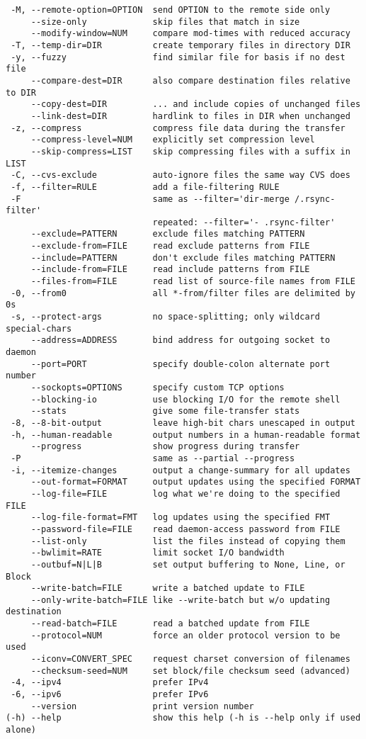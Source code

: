 \begin{lstlisting}
 -M, --remote-option=OPTION  send OPTION to the remote side only
     --size-only             skip files that match in size
     --modify-window=NUM     compare mod-times with reduced accuracy
 -T, --temp-dir=DIR          create temporary files in directory DIR
 -y, --fuzzy                 find similar file for basis if no dest file
     --compare-dest=DIR      also compare destination files relative to DIR
     --copy-dest=DIR         ... and include copies of unchanged files
     --link-dest=DIR         hardlink to files in DIR when unchanged
 -z, --compress              compress file data during the transfer
     --compress-level=NUM    explicitly set compression level
     --skip-compress=LIST    skip compressing files with a suffix in LIST
 -C, --cvs-exclude           auto-ignore files the same way CVS does
 -f, --filter=RULE           add a file-filtering RULE
 -F                          same as --filter='dir-merge /.rsync-filter'
                             repeated: --filter='- .rsync-filter'
     --exclude=PATTERN       exclude files matching PATTERN
     --exclude-from=FILE     read exclude patterns from FILE
     --include=PATTERN       don't exclude files matching PATTERN
     --include-from=FILE     read include patterns from FILE
     --files-from=FILE       read list of source-file names from FILE
 -0, --from0                 all *-from/filter files are delimited by 0s
 -s, --protect-args          no space-splitting; only wildcard special-chars
     --address=ADDRESS       bind address for outgoing socket to daemon
     --port=PORT             specify double-colon alternate port number
     --sockopts=OPTIONS      specify custom TCP options
     --blocking-io           use blocking I/O for the remote shell
     --stats                 give some file-transfer stats
 -8, --8-bit-output          leave high-bit chars unescaped in output
 -h, --human-readable        output numbers in a human-readable format
     --progress              show progress during transfer
 -P                          same as --partial --progress
 -i, --itemize-changes       output a change-summary for all updates
     --out-format=FORMAT     output updates using the specified FORMAT
     --log-file=FILE         log what we're doing to the specified FILE
     --log-file-format=FMT   log updates using the specified FMT
     --password-file=FILE    read daemon-access password from FILE
     --list-only             list the files instead of copying them
     --bwlimit=RATE          limit socket I/O bandwidth
     --outbuf=N|L|B          set output buffering to None, Line, or Block
     --write-batch=FILE      write a batched update to FILE
     --only-write-batch=FILE like --write-batch but w/o updating destination
     --read-batch=FILE       read a batched update from FILE
     --protocol=NUM          force an older protocol version to be used
     --iconv=CONVERT_SPEC    request charset conversion of filenames
     --checksum-seed=NUM     set block/file checksum seed (advanced)
 -4, --ipv4                  prefer IPv4
 -6, --ipv6                  prefer IPv6
     --version               print version number
(-h) --help                  show this help (-h is --help only if used alone)


\end{lstlisting}

